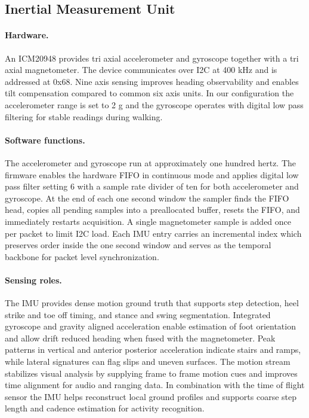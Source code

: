 \documentclass[manuscript,review,anonymous]{acmart}
\begin{document}
\subsection{Inertial Measurement Unit}
\paragraph{Hardware.}
An ICM20948 provides tri axial accelerometer and gyroscope together with a tri axial magnetometer. The device communicates over I2C at 400 kHz and is addressed at 0x68. Nine axis sensing improves heading observability and enables tilt compensation compared to common six axis units. In our configuration the accelerometer range is set to 2 g and the gyroscope operates with digital low pass filtering for stable readings during walking.

\paragraph{Software functions.}
The accelerometer and gyroscope run at approximately one hundred hertz. The firmware enables the hardware FIFO in continuous mode and applies digital low pass filter setting 6 with a sample rate divider of ten for both accelerometer and gyroscope. At the end of each one second window the sampler finds the FIFO head, copies all pending samples into a preallocated buffer, resets the FIFO, and immediately restarts acquisition. A single magnetometer sample is added once per packet to limit I2C load. Each IMU entry carries an incremental index which preserves order inside the one second window and serves as the temporal backbone for packet level synchronization.

\paragraph{Sensing roles.}
The IMU provides dense motion ground truth that supports step detection, heel strike and toe off timing, and stance and swing segmentation. Integrated gyroscope and gravity aligned acceleration enable estimation of foot orientation and allow drift reduced heading when fused with the magnetometer. Peak patterns in vertical and anterior posterior acceleration indicate stairs and ramps, while lateral signatures can flag slips and uneven surfaces. The motion stream stabilizes visual analysis by supplying frame to frame motion cues and improves time alignment for audio and ranging data. In combination with the time of flight sensor the IMU helps reconstruct local ground profiles and supports coarse step length and cadence estimation for activity recognition.
\end{document}
